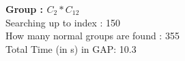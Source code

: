 \textbf{Group : $C_2*C_{12}$}\\
Searching up to index : 150\\
How many normal groups are found : 355\\
Total Time (in s) in GAP: 10.3\\
